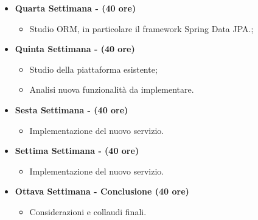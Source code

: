 {\begin{itemize}
        \item \textbf{Quarta Settimana - (40 ore)}
              \begin{itemize}
                  \item Studio ORM, in particolare il \gls{framework} Spring Data
                        JPA.;
              \end{itemize}
        \item \textbf{Quinta Settimana - (40 ore)}
              \begin{itemize}
                  \item Studio della piattaforma \productName esistente;
                  \item Analisi nuova funzionalità da implementare.
              \end{itemize}
        \item \textbf{Sesta Settimana - (40 ore)}
              \begin{itemize}
                  \item Implementazione del nuovo servizio.
              \end{itemize}
        \item \textbf{Settima Settimana - (40 ore)}
              \begin{itemize}
                  \item Implementazione del nuovo servizio.
              \end{itemize}
        \item \textbf{Ottava Settimana - Conclusione (40 ore)}
              \begin{itemize}
                  \item Considerazioni e collaudi finali.
              \end{itemize}
    \end{itemize}
}

\newcommand{\obiettiviObbligatori}{
    \item \underline{\textit{O01}}: Acquisizione competenze sulle
    tematiche sopra descritte;
    \item \underline{\textit{O02}}: Capacità di raggiungere gli obiettivi
    richiesti in autonomia seguendo il cronoprogramma;
    \item \underline{\textit{O03}}: Portare a termine l’implementazione
    dei \glspl{microservizio} richiesti con una percentuale di superamento pari al
    80.

}

\newcommand{\obiettiviDesiderabili}{
    \item \underline{\textit{D01}}: Portare a termine l’implementazione
    dei \glspl{microservizio} richiesti con una percentuale di superamento pari al
    100.
}

\newcommand{\obiettiviFacoltativi}{
    \item \underline{\textit{F01}}: Utilizzo della
    \gls{containerizzazione} per portare tutti i \glspl{microservizio} su Docker.
}